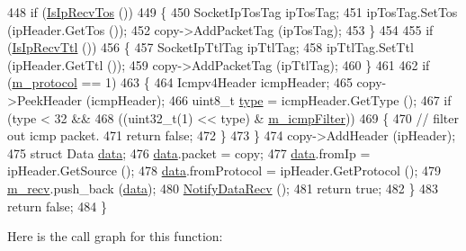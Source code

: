 \begin{DoxyCode}
448       \textcolor{keywordflow}{if} (\hyperlink{classns3_1_1Socket_a5b5addd1a33e306c3113c547705835f9}{IsIpRecvTos} ())
449         \{
450           SocketIpTosTag ipTosTag;
451           ipTosTag.SetTos (ipHeader.GetTos ());
452           copy->AddPacketTag (ipTosTag);
453         \}
454 
455       \textcolor{keywordflow}{if} (\hyperlink{classns3_1_1Socket_abc87245c3eec89fc043d4f043b0be35f}{IsIpRecvTtl} ())
456         \{
457           SocketIpTtlTag ipTtlTag;
458           ipTtlTag.SetTtl (ipHeader.GetTtl ());
459           copy->AddPacketTag (ipTtlTag);
460         \}
461 
462      \textcolor{keywordflow}{if} (\hyperlink{classns3_1_1Ipv4RawSocketImpl_a924effb0eb9a6cbbf1daeb3a7b7ffc94}{m\_protocol} == 1)
463         \{
464           Icmpv4Header icmpHeader;
465           copy->PeekHeader (icmpHeader);
466           uint8\_t \hyperlink{visualizer-ideas_8txt_add98db9e15e2a58cf2b57623e7aa893a}{type} = icmpHeader.GetType ();
467           \textcolor{keywordflow}{if} (type < 32 &&
468               ((uint32\_t(1) << type) & \hyperlink{classns3_1_1Ipv4RawSocketImpl_ab80bb1194c37a7489b342156a7bfcb92}{m\_icmpFilter}))
469             \{
470               \textcolor{comment}{// filter out icmp packet.}
471               \textcolor{keywordflow}{return} \textcolor{keyword}{false};
472             \}
473         \}
474       copy->AddHeader (ipHeader);
475       \textcolor{keyword}{struct }Data \hyperlink{topology-example-sim_8cc_a26c65296e316af77b787dc77469bb2a4}{data};
476       \hyperlink{topology-example-sim_8cc_a26c65296e316af77b787dc77469bb2a4}{data}.packet = copy;
477       \hyperlink{topology-example-sim_8cc_a26c65296e316af77b787dc77469bb2a4}{data}.fromIp = ipHeader.GetSource ();
478       \hyperlink{topology-example-sim_8cc_a26c65296e316af77b787dc77469bb2a4}{data}.fromProtocol = ipHeader.GetProtocol ();
479       \hyperlink{classns3_1_1Ipv4RawSocketImpl_a460de0afa7bc2d11b5e54cf23e361173}{m\_recv}.push\_back (\hyperlink{topology-example-sim_8cc_a26c65296e316af77b787dc77469bb2a4}{data});
480       \hyperlink{classns3_1_1Socket_a91fa3046bbd0a7644381f1d2481bdfef}{NotifyDataRecv} ();
481       \textcolor{keywordflow}{return} \textcolor{keyword}{true};
482     \}
483   \textcolor{keywordflow}{return} \textcolor{keyword}{false};
484 \}
\end{DoxyCode}


Here is the call graph for this function\+:



